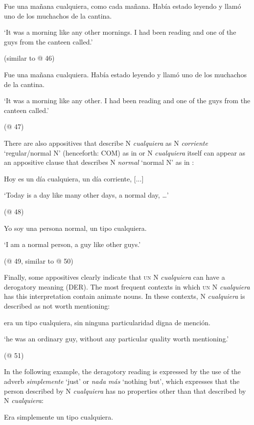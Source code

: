\documentclass[output=paper]{langscibook}
\begin{document}
\label{bkm:Ref42870625}  Fue una mañana cualquiera, como cada mañana. Había estado leyendo y llamó uno de los muchachos de la cantina.

  ‘It was a morning like any other mornings. I had been reading and one of the guys from the canteen called.’

  (similar to @ 46)

\label{bkm:Ref42870616}  Fue una mañana cualquiera. Había estado leyendo y llamó uno de los muchachos de la cantina.

  ‘It was a morning like any other. I had been reading and one of the guys from the canteen called.’

  (@ 47)

There are also appositives that describe N \textit{cualquiera} as N \textit{corriente} ‘regular/normal N’ (henceforth: COM) as in  or N \textit{cualquiera} itself can appear as an appositive clause that describes N \textit{normal} ‘normal N’ as in :

\label{bkm:Ref57554115}  Hoy es un día cualquiera, un día corriente, [...]

  ‘Today is a day like many other days, a normal day, …’

  (@ 48)

\label{bkm:Ref63545479}  Yo soy una persona normal, un tipo cualquiera.

  ‘I am a normal person, a guy like other guys.’

  (@ 49, similar to @ 50)

Finally, some appositives clearly indicate that \textsc{un} N \textit{cualquiera} can have a derogatory meaning (DER). The most frequent contexts in which \textsc{un} N \textit{cualquiera} has this interpretation contain animate nouns. In these contexts, N \textit{cualquiera} is described as not worth mentioning:

  era un tipo cualquiera, sin ninguna particularidad digna de mención.

  ‘he was an ordinary guy, without any particular quality worth mentioning.’

  (@ 51)

In the following example, the deragotory reading is expressed by the use of the adverb \textit{simplemente} ‘just’ or \textit{nada más} ‘nothing but’, which expresses that the person described by N \textit{cualquiera} has no properties other than that described by N \textit{cualquiera}:

  Era simplemente un tipo cualquiera.
\end{document}
